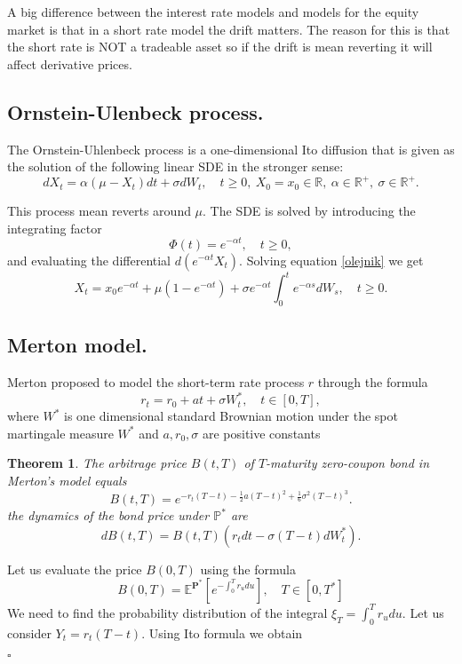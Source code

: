 \documentclass{book}
\newtheorem{theorem}{Theorem}[section]
\newenvironment{proof}
{{\bf Proof. }}{\begin{flushright}$\square$\end{flushright}}
\begin{document}
A big difference between the interest rate models and models for the equity market is that in a short rate model the drift matters. The reason for this is that the short rate is NOT a tradeable asset so if the drift is mean reverting it will affect derivative prices.
\subsection{Ornstein-Ulenbeck process.}
The Ornstein-Uhlenbeck process is a one-dimensional Ito diffusion that is given as the solution of the following linear SDE in the stronger sense:
\begin{equation}
\label{olejnik}
dX_{t}=\alpha(\mu-X_{t})dt+\sigma dW_{t},\quad t\geq 0,\ X_{0}=x_{0}\in\mathbb{R},\ \alpha\in\mathbb{R}^{+},\ \sigma\in\mathbb{R}^{+}.
\end{equation}


This process mean reverts around $\mu$. The SDE is solved by introducing the integrating factor 
$$
\Phi(t)=e^{-\alpha t},\quad t\geq 0,
$$
and evaluating the differential $d(e^{-\alpha t}X_{t})$.
Solving equation \eqref{olejnik} we get
$$
X_{t}=x_{0}e^{-\alpha t}+\mu(1-e^{-\alpha t})+\sigma e^{-\alpha t}\int_{0}^{t}e^{-\alpha s}dW_{s},\quad t\geq 0.
$$  
\subsection{Merton model.}
Merton proposed to model the short-term rate process $r$ through the formula 
\begin{equation}
r_{t}=r_{0}+at+\sigma W^{\ast}_{t},\quad t\in [0,T],
\end{equation}
where $W^{\ast}$ is one dimensional standard Brownian motion under the spot martingale measure $W^{\ast}$ and $a,r_{0},\sigma$ are positive constants
\begin{theorem}
The arbitrage price $B(t,T)$ of $T$-maturity zero-coupon bond in Merton's model equals
\begin{equation}
B(t,T)=e^{-r_{t}(T-t)-\frac{1}{2}a(T-t)^{2}+\frac{1}{6}\sigma^{2}(T-t)^{3}}.
\end{equation}
the dynamics of the bond price under $\mathbb{P}^{\ast}$ are 
$$
dB(t,T)=B(t,T)(r_{t}dt-\sigma(T-t)dW^{\ast}_{t}).
$$
\end{theorem}
\begin{proof}
Let us evaluate the price $B(0,T)$ using the formula
$$
B(0,T)=\mathbb{E}^{\mathbf{P^{\ast}}}\left[e^{-\int_{0}^{T}r_{u}du}\right],\quad T\in [0,T^{\ast}]
$$
We need to find the probability distribution of the integral $\xi_{T}=\int_{0}^{T}r_{u}du$.
Let us consider $Y_{t}=r_{t}(T-t)$. Using Ito formula we obtain
\end{proof}
\end{document}
